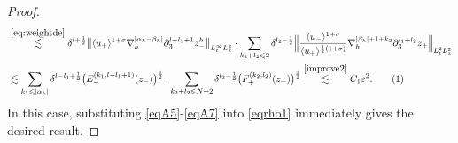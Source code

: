 \documentclass[10pt,reqno]{amsart}
\numberwithin{equation}{section}
\begin{document}
\begin{proof}
\begin{align*}
	&\stackrel{\eqref{eq:weightde}}{\lesssim} \delta^{l+\frac{1}{2}}\big\|\langle u_+\rangle^{1+\sigma}\nabla_h^{|\alpha_h-\beta_h|}\partial_3^{l-l_1+1}z_-^h\big\|_{L^\infty_tL^2_x} \cdot \sum_{k_2+l_2\leqslant 2}\delta^{l_2-\frac{1}{2}}\Big\|\frac{\langle u_-\rangle^{1+\sigma}}{\langle u_+\rangle^{\frac{1}{2}(1+\sigma)}}\nabla_h^{|\beta_h|+1+k_2}\partial_3^{l_1+l_2}z_+\Big\|_{L^2_tL^2_x}\\
	&\lesssim
	 \sum_{k_1\leqslant|\alpha_h|}\delta^{l-l_1+\frac{1}{2}}\big(E_-^{(k_1,l-l_1+1)}(z_-)\big)^{\frac{1}{2}}\cdot\sum_{k_2+l_2\leqslant N+2} \delta^{l_2-\frac{1}{2}}\big(F_+^{(k_2,l_2)}(z_+)\big)^{\frac{1}{2}}
	 \stackrel{\eqref{improve2}}{\lesssim} C_1\varepsilon^2.\stepcounter{equation}\tag{\theequation}\label{eqA7}
\end{align*}
In this case, substituting \eqref{eqA5}-\eqref{eqA7} into \eqref{eqrho1} immediately gives the desired result.


\end{proof}
\end{document}
